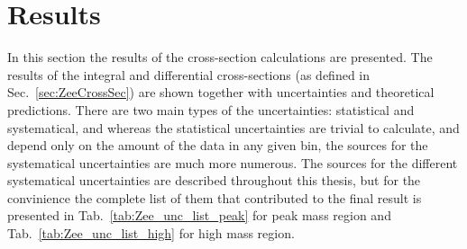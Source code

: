 \chapter{Results}
\label{sec:Results}

In this section the results of the cross-section calculations are presented. The results of the integral and differential cross-sections (as defined in Sec.~\ref{sec:ZeeCrossSec}) are shown together with uncertainties and theoretical predictions. There are two main types of the uncertainties: statistical and systematical, and whereas the statistical uncertainties are trivial to calculate, and depend only on the amount of the data in any given bin, the sources for the systematical uncertainties are much more numerous. The sources for the different systematical uncertainties are described throughout this thesis, but for the convinience the complete list of them that contributed to the final result is presented in Tab.~\ref{tab:Zee_unc_list_peak} for peak mass region and Tab.~\ref{tab:Zee_unc_list_high} for high mass region.

